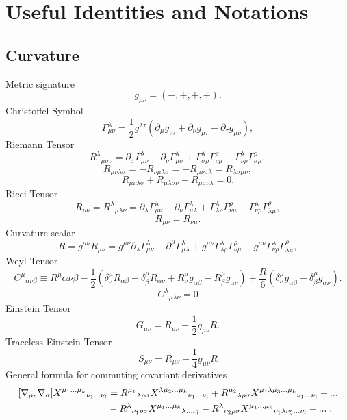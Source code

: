 \chapter{Useful Identities and Notations}
\section{Curvature}
\label{sec:AppCurv}
Metric signature
\[
g_{\mu\nu}=(-,+,+,+)
.\]
Christoffel Symbol
  \[
  \label{Christoffel}
  \Gamma^\lambda_{\mu\nu}=\frac{1}{2}g^{\lambda\tau}(\partial_\mu g_{\nu\tau}+\partial_\nu g_{\mu\tau}-\partial_\tau g_{\mu\nu})
  ,\]
Riemann Tensor
\[
R^{\lambda}{ }_{\mu\sigma\nu}=\partial_{\sigma}\Gamma_{\mu\nu}^{\lambda}-\partial_{\nu}\Gamma_{\mu\sigma}^{\lambda}+\Gamma_{\sigma\rho}^{\lambda}\Gamma_{\nu\mu}^{\rho}-\Gamma_{\nu\rho}^{\lambda}\Gamma_{\sigma\mu}^{\rho}
,\]
\[
R_{\mu\nu\lambda\sigma}=-R_{\nu\mu\lambda\sigma}=-R_{\mu\nu\sigma\lambda}=R_{\lambda\sigma\mu\nu}
,\]
\[
R_{\mu\nu\lambda\sigma}+R_{\mu\lambda\sigma\nu}+R_{\mu\sigma\nu\lambda}=0
.\]
Ricci Tensor
\[
R_{\mu\nu}=R^{\lambda}{ }_{\mu\lambda\nu}=\partial_{\lambda}\Gamma_{\mu\nu}^{\lambda}-\partial_{\nu}\Gamma_{\mu\lambda}^{\lambda}+\Gamma_{\lambda\rho}^{\lambda}\Gamma_{\nu\mu}^{\rho}-\Gamma_{\nu\rho}^{\lambda}\Gamma_{\lambda\mu}^{\rho}
,\]
\[
R_{\mu\nu}=R_{\nu\mu}
.\]
Curvature scalar
\[
R=g^{\mu\nu}R_{\mu\nu}=g^{\mu\nu}\partial_{\lambda}\Gamma_{\mu\nu}^{\lambda}-\partial^{\mu}\Gamma_{\mu\lambda}^{\lambda}+g^{\mu\nu}\Gamma_{\lambda\rho}^{\lambda}\Gamma_{\nu\mu}^{\rho}-g^{\mu\nu}\Gamma_{\nu\rho}^{\lambda}\Gamma_{\lambda\mu}^{\rho}
,\]
Weyl Tensor
\[
C^{\mu}{ }_{\alpha\nu\beta}\equiv R^{\mu}{ }{\alpha\nu\beta}-\frac{1}{2}(\delta_{\nu}^{
\mu}R_{\alpha\beta}-\delta_{\beta}^{\mu}R_{\alpha\nu}+R_{\nu}^{\mu}g_{
\alpha\beta}-R_{\beta}^{\mu}g_{\alpha\nu})+\frac{R}{6}(\delta_{\nu}^{\mu}g_{
\alpha\beta}-\delta_{\beta}^{\mu}g_{\alpha\nu})
.\]
\[
C^\lambda{ }_{\mu\lambda\nu}=0
\]
Einstein Tensor
\[
G_{\mu\nu}=R_{\mu\nu}-\frac{1}{2}g_{\mu\nu}R
.\]
Traceless Einstein Tensor
\[
S_{\mu\nu}=R_{\mu\nu}-\frac{1}{4}g_{\mu\nu}R
\]
General formula for commuting covariant derivatives
\begin{align}
\label{comrel}
[\nabla_{\rho},\nabla_{\sigma}]X^{\mu_{1}...\mu_{k}}{ }{ }{ }{ }_{\nu_{1}...\nu_{l}}	&=	R^{\mu_{1}}{ }_{\lambda\rho\sigma}X^{\lambda\mu_{2}...\mu_{k}}{ }{ }{ }{ }_{\nu_{1}...\nu_{l}}+R^{\mu_{2}}{ }_{\lambda\rho\sigma} X^{\mu_{1}\lambda\mu_{3}...\mu_{k}}{ }{ }{ }{ }_{\nu_{1}...\nu_{l}}+...
	\nonumber	\\&-R^{\lambda}{ }_{\nu_{1}\rho\sigma} X^{\mu_{1}...\mu_{k}}{ }{ }{ }{ }_{\lambda...\nu_{l}}-R^{\lambda}{ }_{\nu_{2}\rho\sigma}X^{\mu_{1}...\mu_{k}}{ }{ }{ }{ }_{\nu_{1}\lambda\nu_{3}...\nu_{l}}-...\;.
		\end{align}
